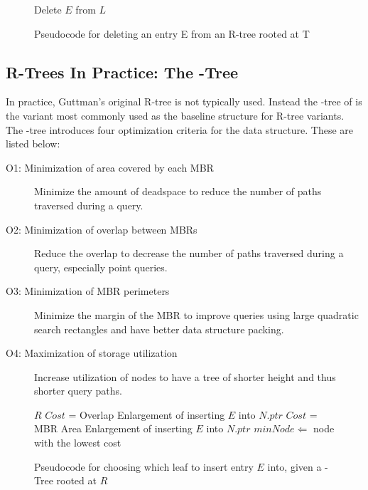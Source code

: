 \begin{figure}[t]
\begin{algorithmic}
	\State {}
	\State Delete $E$ from $L$
	\State {}
\EndFunction
\end{algorithmic}
\caption{Pseudocode for deleting an entry E from an R-tree rooted at T}
\label{fig:R_Tree_Delete}
\end{figure}


\subsection{R-Trees In Practice: The \rstar-Tree}
\label{sec:variants}
In practice, Guttman's original R-tree is not typically used. Instead the 
\rstar-tree of \cite{beckmannkriegelschneiderseeger90} is the variant most 
commonly used as the baseline structure for R-tree variants. The 
\rstar-tree introduces four optimization criteria for the data structure. 
These are listed below:

\begin{description}
	\item[O1: Minimization of area covered by each MBR] Minimize the amount of 
		deadspace to reduce the number of paths traversed during a query.
	\item[O2: Minimization of overlap between MBRs] Reduce the overlap to decrease the
		number of paths traversed during a query, especially point queries.
	\item[O3: Minimization of MBR perimeters] Minimize the margin of the MBR to 
		improve queries using large quadratic search rectangles and have better 
		data structure packing.
	\item[O4: Maximization of storage utilization] Increase utilization of nodes to 
		have a tree of shorter height and thus shorter query paths.
\end{description}

\begin{figure}[ht!]
	\begin{algorithmic}
				\Return $R$
			\Else
						\State $Cost$ = Overlap Enlargement of inserting $E$ into $N.ptr$
					\Else
						\State $Cost$ = MBR Area Enlargement of inserting $E$ into $N.ptr$
					\EndIf
				\EndFor
				\State $minNode \Leftarrow$ node with the lowest cost
			\EndIf
		\EndFunction
	\end{algorithmic}
	\caption{Pseudocode for choosing which leaf to insert entry $E$ into, given a 
	\rstar-Tree rooted at $R$}
	\label{fig:R*-Tree_ChooseLeaf}
\end{figure}

